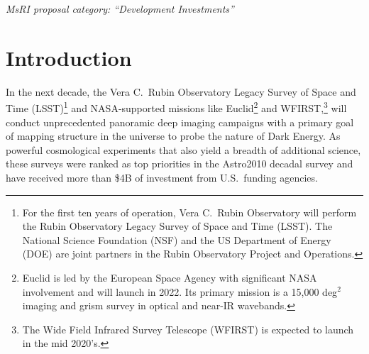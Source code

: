 \documentclass[oneside,11pt]{amsart}
\begin{document}



\setcounter{page}{1}

\centerline{{\it MsRI proposal category: ``Development Investments''}}

\section{Introduction}

In the next decade, the Vera C.~Rubin Observatory Legacy Survey of Space and Time (LSST)\footnote{For the first ten years of operation, Vera C.~Rubin Observatory will perform the Rubin Observatory Legacy Survey of Space and Time (LSST). The National Science Foundation (NSF) and the US Department of Energy (DOE) are joint partners in the Rubin Observatory Project and Operations.} and NASA-supported missions like Euclid\footnote{Euclid is led by the European Space Agency with significant NASA involvement and will launch in 2022. Its primary mission is a 15,000 deg$^2$ imaging and grism survey in optical and near-IR wavebands.} and WFIRST,\footnote{The Wide Field Infrared Survey Telescope (WFIRST) is expected to launch in the mid 2020's.} will conduct unprecedented panoramic deep imaging campaigns with a primary goal of mapping structure in the universe to probe the nature of Dark Energy.  As powerful cosmological experiments that also yield a breadth of additional science, these surveys were ranked as top priorities in the Astro2010 decadal survey and have received more than \$4B of investment from U.S.\ funding agencies.
\end{document}
